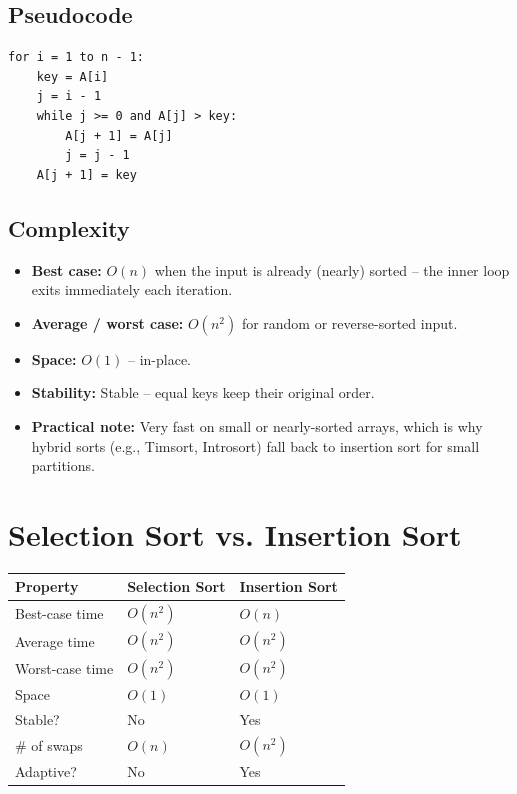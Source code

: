 \documentclass[11pt]{article}
\begin{document}
\subsection*{Pseudocode}
\begin{lstlisting}[basicstyle=\ttfamily\small,frame=single]
for i = 1 to n - 1:
    key = A[i]
    j = i - 1
    while j >= 0 and A[j] > key:
        A[j + 1] = A[j]
        j = j - 1
    A[j + 1] = key
\end{lstlisting}

\subsection*{Complexity}
\begin{itemize}[leftmargin=*]
    \item \textbf{Best case:} $O(n)$ when the input is already (nearly) sorted
          -- the inner loop exits immediately each iteration.
    \item \textbf{Average / worst case:} $O(n^2)$ for random or reverse-sorted
          input.
    \item \textbf{Space:} $O(1)$ -- in-place.
    \item \textbf{Stability:} Stable -- equal keys keep their original order.
    \item \textbf{Practical note:} Very fast on small or nearly-sorted arrays,
          which is why hybrid sorts (e.g., Timsort, Introsort) fall back to
          insertion sort for small partitions.
\end{itemize}

\section{Selection Sort vs. Insertion Sort}
\begin{center}
\begin{tabular}{l|l|l}
\textbf{Property} & \textbf{Selection Sort} & \textbf{Insertion Sort} \\ \hline
Best-case time    & $O(n^2)$                & $O(n)$                  \\
Average time      & $O(n^2)$                & $O(n^2)$                \\
Worst-case time   & $O(n^2)$                & $O(n^2)$                \\
Space             & $O(1)$                  & $O(1)$                  \\
Stable?           & No                      & Yes                     \\
\# of swaps       & $O(n)$                  & $O(n^2)$                \\
Adaptive?         & No                      & Yes                     \\
\end{tabular}
\end{center}
\end{document}

